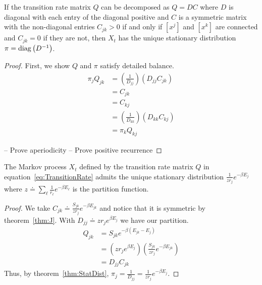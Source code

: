 \begin{mythm}
\label{thm:StatDist}
If the transition rate matrix $Q$ can be decomposed as $Q = DC$ where $D$ is diagonal with each entry of the diagonal positive and $C$ is a symmetric matrix with the non-diagonal entries $C_{jk} > 0$ if and only if $[x^j]$ and $[x^k]$ are connected and $C_{jk} = 0$ if they are not, then $X_t$ has the unique stationary distribution $\pi = \operatorname{diag}\left(D^{-1}\right)$.         
\end{mythm}
\begin{proof}
First, we show $Q$ and $\pi$ satisfy detailed balance.
\begin{align}
\pi_jQ_{jk} &= \left(\frac{1}{D_{jj}}\right)\left(D_{jj}C_{jk}\right) \\
&= C_{jk} \\
&= C_{kj} \\
&= \left(\frac{1}{D_{kk}}\right)\left(D_{kk}C_{kj}\right) \\
                    &= \pi_kQ_{kj}
\end{align}

-- Prove aperiodicity 
-- Prove positive recurrence

\end{proof}


\begin{mythm}
\label{thm:E}
The Markov process $X_t$ defined by the transition rate matrix $Q$ in equation~\ref{eq:TransitionRate} admits the unique stationary distribution $\frac{1}{zr_j}e^{-\beta E_j}$ where $z \doteq \sum_\ell \frac{1}{r_\ell}e^{-\beta E_\ell}$ is the partition function. 
\end{mythm}
\begin{proof}
We take $C_{jk} \doteq \frac{S_{jk}}{zr_j}e^{-\beta E_{jk}}$ and notice that it is symmetric by theorem~\ref{thm:J}. With $D_{jj} \doteq zr_je^{\beta E_j}$ we have our partition.  
\begin{align}
Q_{jk} &= S_{jk}e^{-\beta\left(E_{jk} - E_j\right)} \\
       &= \left(zr_je^{\beta E_j}\right) \left(\frac{S_{jk}}{zr_j}e^{-\beta E_{jk}}\right) \\
       &= D_{jj}C_{jk}    
\end{align}
Thus, by theorem~\ref{thm:StatDist},  $\pi_j = \frac{1}{D_{jj}} = \frac{1}{zr_j}e^{-\beta E_j}$.
\end{proof}




